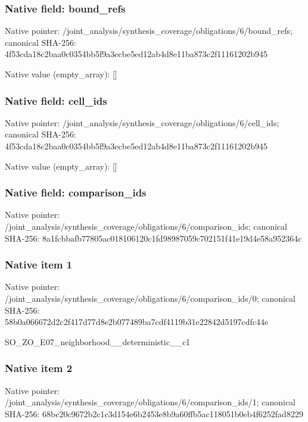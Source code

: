 \documentclass[10pt,a4paper]{article}
\begin{document}
\subsubsection{Native field: bound\_\allowbreak{}refs}
Native pointer: /joint\_\allowbreak{}analysis/synthesis\_\allowbreak{}coverage/obligations/6/bound\_\allowbreak{}refs; canonical SHA-256: 4f53cda18c2baa0c0354bb5f9a3ecbe5ed12ab4d8e11ba873c2f11161202b945

Native value (empty\_\allowbreak{}array): []

\subsubsection{Native field: cell\_\allowbreak{}ids}
Native pointer: /joint\_\allowbreak{}analysis/synthesis\_\allowbreak{}coverage/obligations/6/cell\_\allowbreak{}ids; canonical SHA-256: 4f53cda18c2baa0c0354bb5f9a3ecbe5ed12ab4d8e11ba873c2f11161202b945

Native value (empty\_\allowbreak{}array): []

\subsubsection{Native field: comparison\_\allowbreak{}ids}
Native pointer: /joint\_\allowbreak{}analysis/synthesis\_\allowbreak{}coverage/obligations/6/comparison\_\allowbreak{}ids; canonical SHA-256: 8a1fcbbafb77805ac018106120c1fd98987059c702151f41e19d4e58a952364c

\subsubsection{Native item 1}
Native pointer: /joint\_\allowbreak{}analysis/synthesis\_\allowbreak{}coverage/obligations/6/comparison\_\allowbreak{}ids/0; canonical SHA-256: 58b0a066672d2c2f417d77d8e2b077489ba7cdf4119b31e22842d5197cdfc44e

\begingroup\raggedright\sloppy SO\_\allowbreak{}ZO\_\allowbreak{}E07\_\allowbreak{}neighborhood\_\allowbreak{}\_\allowbreak{}deterministic\_\allowbreak{}\_\allowbreak{}c1\par\endgroup

\subsubsection{Native item 2}
Native pointer: /joint\_\allowbreak{}analysis/synthesis\_\allowbreak{}coverage/obligations/6/comparison\_\allowbreak{}ids/1; canonical SHA-256: 68bc20c9672b2c1c3d154e6b2453e8b9a60ffb5ac118051b0eb4f6252fad8229
\end{document}
